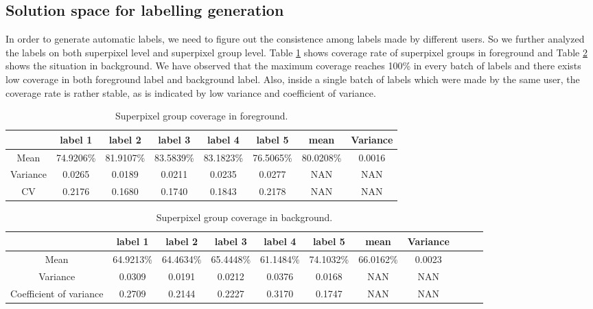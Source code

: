 \documentclass[runningheads,a4paper]{llncs}
\begin{document}
\subsection{Solution space for labelling generation}
 In order to generate automatic labels, we need to figure out the consistence among labels made by different users. So we further analyzed the labels on both superpixel level and superpixel group level. Table \ref{ta: label coverage f} shows coverage rate of superpixel groups in foreground and Table \ref{ta: label coverage b} shows the situation in background.
We have observed that the maximum coverage reaches 100\% in every batch of labels and there exists low coverage in both foreground label and background label. Also, inside a single batch of labels which were made by the same user, the coverage rate is rather stable, as is indicated by low variance and coefficient of variance.


\begin{table}
\centering
\begin{tabular}{|c|c|c|c|c|c|c|c|}
\hline
 & label 1 & label 2&label 3&label 4&label 5&mean&Variance\\
\hline
Mean& 74.9206\% & 81.9107\% & 83.5839\%& 83.1823\%& 76.5065\%&80.0208\%&0.0016 \\
\hline
Variance& 0.0265 & 0.0189 & 0.0211& 0.0235& 0.0277&NAN&NAN \\
\hline
CV& 0.2176 & 0.1680 & 0.1740& 0.1843& 0.2178&NAN&NAN \\
\hline
\end{tabular}
\caption{Superpixel group coverage in foreground.}
\label{ta: label coverage f}
\end{table}

\begin{table}
\centering
\begin{tabular}{|c|c|c|c|c|c|c|c|c|c|c|}
\hline
 & label 1 & label 2&label 3&label 4&label 5&mean&Variance \\
\hline
Mean& 64.9213\% & 64.4634\% & 65.4448\%& 61.1484\%& 74.1032\%&66.0162\%&0.0023 \\
\hline
Variance& 0.0309 & 0.0191 & 0.0212& 0.0376& 0.0168&NAN&NAN \\
\hline
Coefficient of variance& 0.2709 & 0.2144 & 0.2227& 0.3170& 0.1747&NAN&NAN \\
\hline
\end{tabular}
\caption{Superpixel group coverage in background.}
\label{ta: label coverage b}
\end{table}
\end{document}
